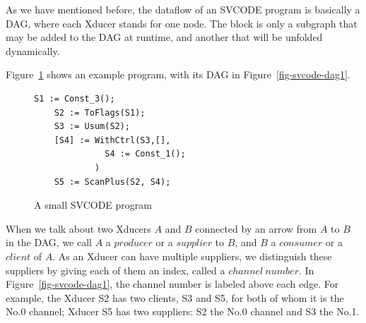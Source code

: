 %

	

As we have mentioned before, the dataflow of an SVCODE program is basically a DAG, where each Xducer stands for one node. 
The \wc block is only a subgraph that may be added to the DAG at runtime,  
and \sc another that will be unfolded dynamically.

Figure~\ref{fig-svcode-eg1} shows an example program, with its DAG in Figure~\ref{fig-svcode-dag1}. \\

\begin{figure}[H]
	\begin{lstlisting}[style=svcode-style]
	S1 := Const_3();
	S2 := ToFlags(S1);
	S3 := Usum(S2);
	[S4] := WithCtrl(S3,[], 
	          S4 := Const_1();
	        )
	S5 := ScanPlus(S2, S4);
	\end{lstlisting}	
	\caption{A small SVCODE program \label{fig-svcode-eg1}}
\end{figure}
\hspace{1cm}



When we talk about two Xducers $A$ and $B$ connected by an arrow from $A$ to $B$ in the DAG, we call $A$ a $producer$ or a $supplier$ to $B$, and $B$ a $consumer$ or a $client$ of $A$. 
As an Xducer can have multiple suppliers, we distinguish these suppliers by giving each of them an index, called a $channel \ number$. 
In Figure~\ref{fig-svcode-dag1}, the channel number is labeled above each edge. 
For example, the Xducer S2 has two clients, S3 and S5, for both of whom it is the No.0 channel;  Xducer S5 has two suppliers: S2 the No.0 channel and S3 the No.1. 




